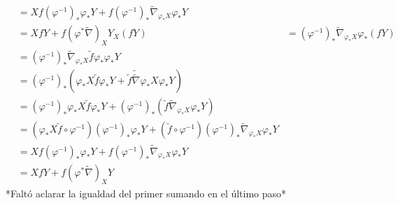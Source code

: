 \documentclass[11pt]{article}
\begin{document}
\begin{enumerate}
\begin{align*}
			&=Xf(\varphi^{-1})_*\varphi_*Y+f(\varphi^{-1})_*\widetilde{\nabla}_{\varphi_*X}\varphi_*Y\\
			&=XfY+f(\varphi^*\widetilde{\nabla})_{X}Y_{X}(fY)&=(\varphi^{-1})_*\widetilde{\nabla}_{\varphi_*X}\varphi_*(fY)\\
			&=(\varphi^{-1})_*\widetilde{\nabla}_{\varphi_*X}\tilde{f}\varphi_*\varphi_*Y\\
			&=(\varphi^{-1})_*\left( \varphi_*X\tilde{f}\varphi_*Y+\tilde{f}\widetilde{\widetilde{\nabla}}{\varphi_*X}\varphi_*Y\right)\\
			&=(\varphi^{-1})_*\varphi_*X\tilde{f}\varphi_*Y+(\varphi^{-1})_*(\tilde{f}\widetilde{\nabla}_{\varphi_*X}\varphi_*Y)\\
			&=(\varphi_*X\tilde{f}\circ\varphi^{-1})(\varphi^{-1})_*\varphi_*Y+(\tilde{f}\circ\varphi^{-1})(\varphi^{-1})_*\widetilde{\nabla}_{\varphi_*X}\varphi_*Y\\
			&=Xf(\varphi^{-1})_*\varphi_*Y+f(\varphi^{-1})_*\widetilde{\nabla}_{\varphi_*X}\varphi_*Y\\
			&=XfY+f(\varphi^*\widetilde{\nabla})_{X}Y
		\end{align*}
		*Faltó aclarar la igualdad del primer sumando en el último paso*
	\end{enumerate}
	\newpage
	
\end{document}
